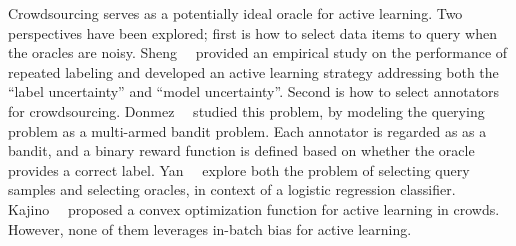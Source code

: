 {
Crowdsourcing serves as a potentially ideal oracle for active learning.
Two perspectives have been explored; 
first is how to select data items to query when the oracles are noisy.
Sheng~\etal~\cite{sheng:kdd2008} provided an empirical study on the performance of repeated labeling and developed an active learning strategy addressing both the ``label uncertainty'' and ``model uncertainty''.
Second is how to select annotators for crowdsourcing.
Donmez~\etal~\cite{donmez:kdd2009} studied this problem, by modeling the querying problem as a multi-armed bandit problem.  Each annotator is regarded as as a bandit, and a binary reward function is defined based on whether the oracle provides a correct label.  %
Yan~\etal~\cite{yan:icml2011} explore both the problem of selecting query samples and selecting oracles, in context of a logistic regression classifier.
Kajino~\etal~\cite{kajino:aaai2012} proposed a convex optimization function for active learning in crowds.  
However, none of them leverages in-batch bias for active learning.
}


